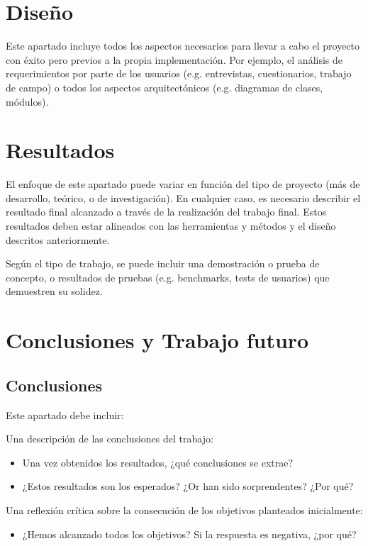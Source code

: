 \documentclass{uoc_memoria}
\begin{document}
\clearpage
\section{Diseño}

\begin{guidancebox}
Este apartado incluye todos los aspectos necesarios para llevar a cabo el proyecto con éxito pero previos a la propia implementación. Por ejemplo, el análisis de requerimientos por parte de los usuarios (e.g. entrevistas, cuestionarios, trabajo de campo) o todos los aspectos arquitectónicos (e.g. diagramas de clases, módulos).
\end{guidancebox}

\clearpage
\section{Resultados}

\begin{guidancebox}
El enfoque de este apartado puede variar en función del tipo de proyecto (más de desarrollo, teórico, o de investigación). En cualquier caso, es necesario describir el resultado final alcanzado a través de la realización del trabajo final. Estos resultados deben estar alineados con las herramientas y métodos y el diseño descritos anteriormente.

Según el tipo de trabajo, se puede incluir una demostración o prueba de concepto, o resultados de pruebas (e.g. benchmarks, tests de usuarios) que demuestren su solidez.
\end{guidancebox}

\clearpage
\section{Conclusiones y Trabajo futuro}

\subsection{Conclusiones}

\begin{guidancebox}
Este apartado debe incluir:

Una descripción de las conclusiones del trabajo:
\begin{itemize}
  \item Una vez obtenidos los resultados, ¿qué conclusiones se extrae?
  \item ¿Estos resultados son los esperados? ¿Or han sido sorprendentes? ¿Por qué?
\end{itemize}

Una reflexión crítica sobre la consecución de los objetivos planteados inicialmente:
\begin{itemize}
  \item ¿Hemos alcanzado todos los objetivos? Si la respuesta es negativa, ¿por qué?
\end{itemize}
\end{guidancebox}
\end{document}
